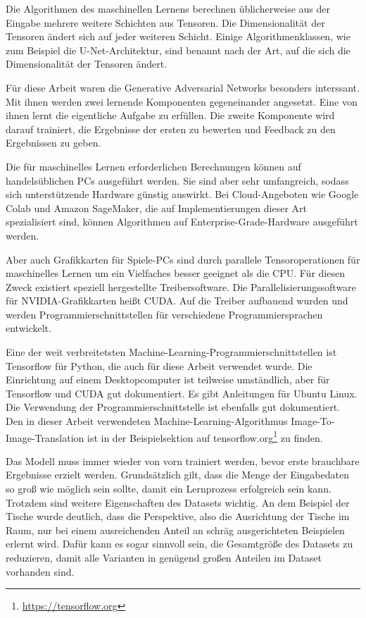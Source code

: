 Die Algorithmen des maschinellen Lernens berechnen üblicherweise aus der Eingabe mehrere weitere Schichten aus Tensoren. Die Dimensionalität der Tensoren ändert sich auf jeder weiteren Schicht. Einige Algorithmenklassen, wie zum Beispiel die U-Net-Architektur, sind benannt nach der Art, auf die sich die Dimensionalität der Tensoren ändert.

Für diese Arbeit waren die Generative Adversarial Networks besonders interssant. Mit ihnen werden zwei lernende Komponenten gegeneinander angesetzt. Eine von ihnen lernt die eigentliche Aufgabe zu erfüllen. Die zweite Komponente wird darauf trainiert, die Ergebnisse der ersten zu bewerten und Feedback zu den Ergebnissen zu geben.

Die für maschinelles Lernen erforderlichen Berechnungen können auf handelsüblichen PCs ausgeführt werden. Sie sind aber sehr umfangreich, sodass sich unterstützende Hardware günstig auswirkt. Bei Cloud-Angeboten wie Google Colab und Amazon SageMaker, die auf Implementierungen dieser Art spezialisiert sind, können Algorithmen auf Enterprise-Grade-Hardware ausgeführt werden.

Aber auch Grafikkarten für Spiele-PCs sind durch parallele Tensoroperationen für maschinelles Lernen um ein Vielfaches besser geeignet als die CPU. Für diesen Zweck existiert speziell hergestellte Treibersoftware. Die Parallelisierungssoftware für NVIDIA-Grafikkarten heißt CUDA. Auf die Treiber aufbauend wurden und werden Programmierschnittstellen für verschiedene Programmiersprachen entwickelt.

Eine der weit verbreitetsten Machine-Learning-Programmierschnittstellen ist Tensorflow für Python, die auch für diese Arbeit verwendet wurde. Die Einrichtung auf einem Desktopcomputer ist teilweise umständlich, aber für Tensorflow und CUDA gut dokumentiert. Es gibt Anleitungen für Ubuntu Linux. Die Verwendung der Programmierschnittstelle ist ebenfalls gut dokumentiert. Den in dieser Arbeit verwendeten Machine-Learning-Algorithmus Image-To-Image-Translation ist in der Beispielsektion auf tensorflow.org\footnote{\href{https://tensorflow.org}{https://tensorflow.org}} zu finden.

Das Modell muss immer wieder von vorn trainiert werden, bevor erste brauchbare Ergebnisse erzielt werden. Grundsätzlich gilt, dass die Menge der Eingabedaten so groß wie möglich sein sollte, damit ein Lernprozess erfolgreich sein kann. Trotzdem sind weitere Eigenschaften des Datasets wichtig. An dem Beispiel der Tische wurde deutlich, dass die Perspektive, also die Ausrichtung der Tische im Raum, nur bei einem ausreichenden Anteil an schräg ausgerichteten Beispielen erlernt wird. Dafür kann es sogar sinnvoll sein, die Gesamtgröße des Datasets zu reduzieren, damit alle Varianten in genügend großen Anteilen im Dataset vorhanden sind.

